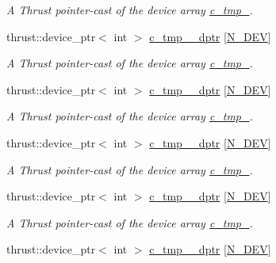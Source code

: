 \begin{DoxyCompactItemize}
\begin{DoxyCompactList}\small\item\em A Thrust pointer-\/cast of the device array \hyperlink{classMesh_a7cdb75040bd5f280fd1b019ea99383ac}{c\+\_\+tmp\+\_}. \end{DoxyCompactList}\item 
thrust\+::device\+\_\+ptr$<$ int $>$ \hyperlink{classMesh_a73e052cc381502dc0224d445a3459711}{c\+\_\+tmp\+\_\+\_\+dptr} \mbox{[}\hyperlink{cppspec_8h_a2b674dab7a14f1bf32b48b7fda5022dc}{N\+\_\+\+D\+EV}\mbox{]}
\begin{DoxyCompactList}\small\item\em A Thrust pointer-\/cast of the device array \hyperlink{classMesh_a143a21c2ce68c4b6caa2f7eabd562004}{c\+\_\+tmp\+\_}. \end{DoxyCompactList}\item 
thrust\+::device\+\_\+ptr$<$ int $>$ \hyperlink{classMesh_adff4554afd7c75a1aebe67ce95f8bad1}{c\+\_\+tmp\+\_\+\_\+dptr} \mbox{[}\hyperlink{cppspec_8h_a2b674dab7a14f1bf32b48b7fda5022dc}{N\+\_\+\+D\+EV}\mbox{]}
\begin{DoxyCompactList}\small\item\em A Thrust pointer-\/cast of the device array \hyperlink{classMesh_ad875e5453de00af10651239c02bfe821}{c\+\_\+tmp\+\_}. \end{DoxyCompactList}\item 
thrust\+::device\+\_\+ptr$<$ int $>$ \hyperlink{classMesh_ad099220464b551c59ce43c9bfffeb335}{c\+\_\+tmp\+\_\+\_\+dptr} \mbox{[}\hyperlink{cppspec_8h_a2b674dab7a14f1bf32b48b7fda5022dc}{N\+\_\+\+D\+EV}\mbox{]}
\begin{DoxyCompactList}\small\item\em A Thrust pointer-\/cast of the device array \hyperlink{classMesh_a139c783dde5036a64bd83c02b65990bd}{c\+\_\+tmp\+\_}. \end{DoxyCompactList}\item 
thrust\+::device\+\_\+ptr$<$ int $>$ \hyperlink{classMesh_ab83bb565c6d935d1a82c52de4816a679}{c\+\_\+tmp\+\_\+\_\+dptr} \mbox{[}\hyperlink{cppspec_8h_a2b674dab7a14f1bf32b48b7fda5022dc}{N\+\_\+\+D\+EV}\mbox{]}
\begin{DoxyCompactList}\small\item\em A Thrust pointer-\/cast of the device array \hyperlink{classMesh_ad6e01f4bf87d025aa407a79fedbf73fd}{c\+\_\+tmp\+\_}. \end{DoxyCompactList}\item 
thrust\+::device\+\_\+ptr$<$ int $>$ \hyperlink{classMesh_a7f6a6fff767faf0cb67ab9d1cc7e478a}{c\+\_\+tmp\+\_\+\_\+dptr} \mbox{[}\hyperlink{cppspec_8h_a2b674dab7a14f1bf32b48b7fda5022dc}{N\+\_\+\+D\+EV}\mbox{]}

\end{DoxyCompactItemize}
